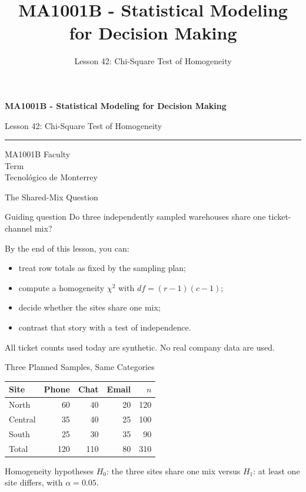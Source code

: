 \documentclass[aspectratio=169,10pt,english]{beamer}
\title{MA1001B - Statistical Modeling for Decision Making}
\subtitle{Lesson 42: Chi-Square Test of Homogeneity}
\author{}
\institute{Tecnol\'ogico de Monterrey}
\date{}
\begin{document}
\begin{frame}[plain]
  \vspace{1.2cm}
  {\Large\bfseries MA1001B - Statistical Modeling for Decision Making\par}
  \vspace{0.7cm}
  {\large Lesson 42: Chi-Square Test of Homogeneity\par}
  \vspace{0.7cm}
  {\color{TecRojo}\rule{\textwidth}{1.2pt}}
  \vspace{0.8cm}

  MA1001B Faculty\\[0.3cm]
  Term\\[0.3cm]
  Tecnol\'ogico de Monterrey
\end{frame}

\begin{frame}{The Shared-Mix Question}
  \begin{alertblock}{Guiding question}
    Do three independently sampled warehouses share one ticket-channel mix?
  \end{alertblock}

  \vspace{0.6em}
  By the end of this lesson, you can:
  \begin{itemize}
    \item treat row totals as fixed by the sampling plan;
    \item compute a homogeneity $\chi^2$ with $df=(r-1)(c-1)$;
    \item decide whether the sites share one mix;
    \item contrast that story with a test of independence.
  \end{itemize}

  \vfill
  \scriptsize All ticket counts used today are synthetic. No real company data are used.
\end{frame}

\begin{frame}{Three Planned Samples, Same Categories}
  \small
  \begin{center}
    \begin{tabular}{lrrrr}
      \toprule
      \textbf{Site} & \textbf{Phone} & \textbf{Chat} & \textbf{Email} & \textbf{$n$} \\
      \midrule
      North & 60 & 40 & 20 & 120 \\
      Central & 35 & 40 & 25 & 100 \\
      South & 25 & 30 & 35 & 90 \\
      \midrule
      Total & 120 & 110 & 80 & 310 \\
      \bottomrule
    \end{tabular}
  \end{center}

  \vspace{0.3em}
  \begin{exampleblock}{Homogeneity hypotheses}
    $H_0$: the three sites share one mix versus $H_1$: at least one site
    differs, with $\alpha=0.05$.
  \end{exampleblock}
\end{frame}
\end{document}
